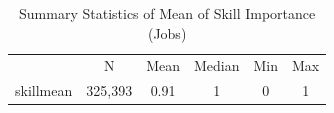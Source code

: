 \begin{table}[htbp]\centering
\def\sym#1{\ifmmode^{#1}\else\(^{#1}\)\fi}
\caption{Summary Statistics of Mean of Skill Importance  (Jobs)}
\begin{tabular}{l*{1}{ccccc}}
\toprule
                    &           N&        Mean&      Median&         Min&         Max\\
\label{tab:jobskillmean}
skillmean           &     325,393&        0.91&           1&           0&           1\\
\bottomrule
\end{tabular}
\end{table}

